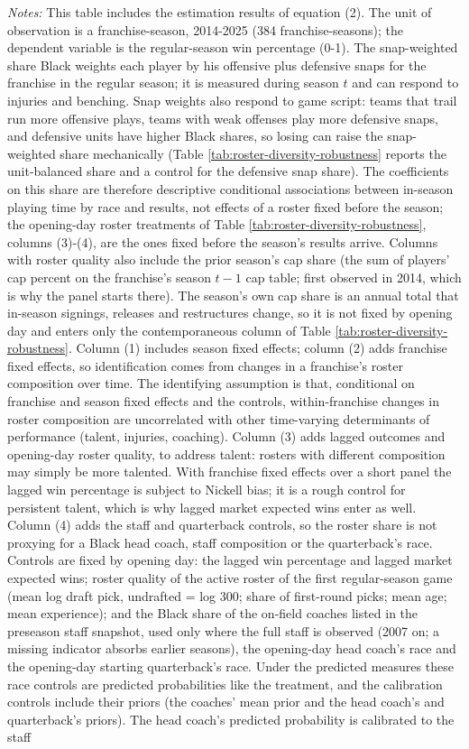 {\footnotesize
\noindent\textit{Notes:} This table includes the estimation results of equation (2). The unit of observation is a franchise-season, 2014-2025 (384 franchise-seasons); the dependent variable is the regular-season win percentage (0-1). The snap-weighted share Black weights each player by his offensive plus defensive snaps for the franchise in the regular season; it is measured during season $t$ and can respond to injuries and benching. Snap weights also respond to game script: teams that trail run more offensive plays, teams with weak offenses play more defensive snaps, and defensive units have higher Black shares, so losing can raise the snap-weighted share mechanically (Table \ref{tab:roster-diversity-robustness} reports the unit-balanced share and a control for the defensive snap share). The coefficients on this share are therefore descriptive conditional associations between in-season playing time by race and results, not effects of a roster fixed before the season; the opening-day roster treatments of Table \ref{tab:roster-diversity-robustness}, columns (3)-(4), are the ones fixed before the season's results arrive. Columns with roster quality also include the prior season's cap share (the sum of players' cap percent on the franchise's season $t-1$ cap table; first observed in 2014, which is why the panel starts there). The season's own cap share is an annual total that in-season signings, releases and restructures change, so it is not fixed by opening day and enters only the contemporaneous column of Table \ref{tab:roster-diversity-robustness}. Column (1) includes season fixed effects; column (2) adds franchise fixed effects, so identification comes from changes in a franchise's roster composition over time. The identifying assumption is that, conditional on franchise and season fixed effects and the controls, within-franchise changes in roster composition are uncorrelated with other time-varying determinants of performance (talent, injuries, coaching). Column (3) adds lagged outcomes and opening-day roster quality, to address talent: rosters with different composition may simply be more talented. With franchise fixed effects over a short panel the lagged win percentage is subject to Nickell bias; it is a rough control for persistent talent, which is why lagged market expected wins enter as well. Column (4) adds the staff and quarterback controls, so the roster share is not proxying for a Black head coach, staff composition or the quarterback's race. Controls are fixed by opening day: the lagged win percentage and lagged market expected wins; roster quality of the active roster of the first regular-season game (mean log draft pick, undrafted = log 300; share of first-round picks; mean age; mean experience); and the Black share of the on-field coaches listed in the preseason staff snapshot, used only where the full staff is observed (2007 on; a missing indicator absorbs earlier seasons), the opening-day head coach's race and the opening-day starting quarterback's race. Under the predicted measures these race controls are predicted probabilities like the treatment, and the calibration controls include their priors (the coaches' mean prior and the head coach's and quarterback's priors). The head coach's predicted probability is calibrated to the staff }

